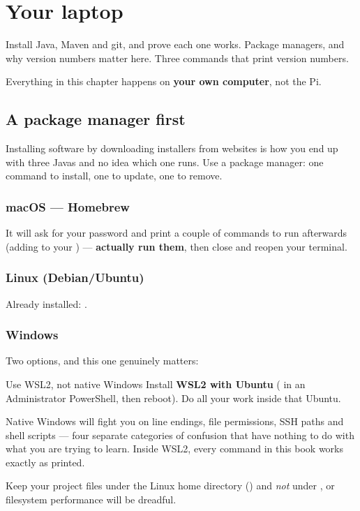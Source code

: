 \chapter{Your laptop}
\label{ch:laptop}

\chapterbrief
  {Install Java, Maven and git, and prove each one works.}
  {Package managers, and why version numbers matter here.}
  {Three commands that print version numbers.}

Everything in this chapter happens on \textbf{your own computer}, not the Pi.

\section{A package manager first}

Installing software by downloading installers from websites is how you end up
with three Javas and no idea which one runs. Use a package manager: one command
to install, one to update, one to remove.

\subsection*{macOS --- Homebrew}


It will ask for your password and print a couple of commands to run afterwards
(adding \code{brew} to your \code{PATH}) --- \textbf{actually run them}, then
close and reopen your terminal.

\subsection*{Linux (Debian/Ubuntu)}

Already installed: .

\subsection*{Windows}

Two options, and this one genuinely matters:

\begin{trap}{Use WSL2, not native Windows}
Install \textbf{WSL2 with Ubuntu} ( in an Administrator
PowerShell, then reboot). Do all your work inside that Ubuntu.

Native Windows will fight you on line endings, file permissions, SSH paths and
shell scripts --- four separate categories of confusion that have nothing to do
with what you are trying to learn. Inside WSL2, every command in this book works
exactly as printed.

Keep your project files under the Linux home directory (\code{\textasciitilde/})
and \emph{not} under \code{/mnt/c/}, or filesystem performance will be dreadful.
\end{trap}

